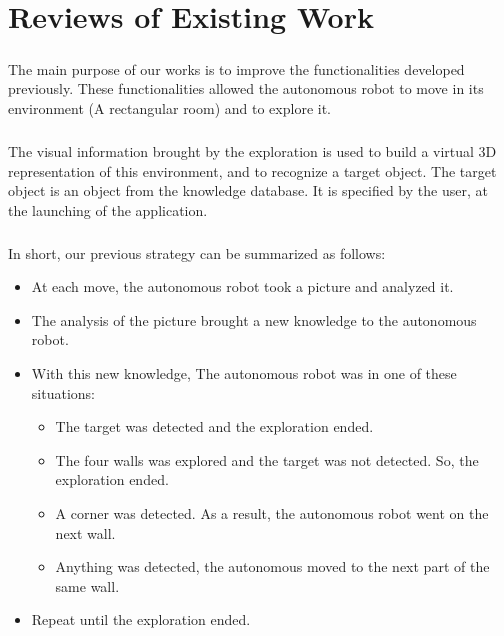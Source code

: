 \documentclass[12pt]{report}
\begin{document}
	
    \chapter{Reviews of Existing Work}
	
	\paragraph{}
	The main purpose of our works is to improve the functionalities developed previously. These functionalities allowed the autonomous robot to move in its environment (A rectangular room) and to explore it. 
	
	\paragraph{}
	The visual information brought by the exploration is used to build a virtual 3D representation of this environment, and to recognize a target object. The target object is an object from the knowledge database. It is specified by the user, at the launching of the application.
	
	\paragraph{}
	In short, our previous strategy can be summarized as follows:
	\begin{itemize}
		\item At each move, the autonomous robot took a picture and analyzed it.
		\item The analysis of the picture brought a new knowledge to the autonomous robot.
		\item With this new knowledge, The autonomous robot was in one of these situations:
		\begin{itemize}
			\item The target was detected and the exploration ended.
			\item The four walls was explored and the target was not detected. So, the exploration ended.
			\item A corner was detected. As a result, the autonomous robot went on the next wall.
			\item Anything was detected, the autonomous moved to the next part of the same wall.
		\end{itemize}
		\item Repeat until the exploration ended.
	\end{itemize}
\end{document}
